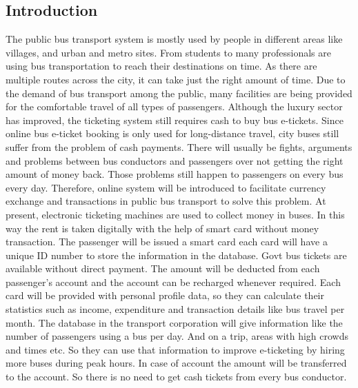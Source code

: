 \documentclass{article}
\begin{document}
\subsection{Introduction}
The public bus transport system is mostly used by people in different areas like villages, and urban and metro sites. From students to many professionals are using bus transportation to reach their destinations on time. As there are multiple routes across the city, it can take just the right amount of time. Due to the demand of bus transport among the public, many facilities are being provided for the comfortable travel of all types of passengers. Although the luxury sector has improved, the ticketing system still requires cash to buy bus e-tickets. Since online bus e-ticket booking is only used for long-distance travel, city buses still suffer from the problem of cash payments. There will usually be fights, arguments and problems between bus conductors and passengers over not getting the right amount of money back. Those problems still happen to passengers on every bus every day. Therefore, online system will be introduced to facilitate currency exchange and transactions in public bus transport to solve this problem. At present, electronic ticketing machines are used to collect money in buses. In this way the rent is taken digitally with the help of smart card without money transaction. The passenger will be issued a smart card each card will have a unique ID number to store the information in the database. Govt bus tickets are available without direct payment. The amount will be deducted from each passenger's account and the account can be recharged whenever required. Each card will be provided with personal profile data, so they can calculate their statistics such as income, expenditure and transaction details like bus travel per month. The database in the transport corporation will give information like the number of passengers using a bus per day. And on a trip, areas with high crowds and times etc. So they can use that information to improve e-ticketing by hiring more buses during peak hours. In case of account the amount will be transferred to the account. So there is no need to get cash tickets from every bus conductor.
\newpage
\end{document}
